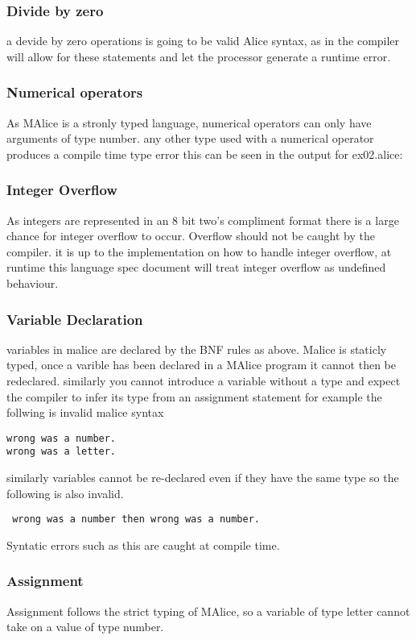 \documentclass[a4wide, 10pt]{article}
\begin{document}
\subsubsection{Divide by zero}
a devide by zero operations is going to be valid Alice syntax, as in the compiler
will allow for these statements and let the processor generate a runtime error.


\subsubsection{Numerical operators}
As MAlice is a stronly typed language, numerical operators can only have 
arguments of type number. any other type used with a numerical operator produces
a compile time type error this can be seen in the output for ex02.alice:


\subsubsection{Integer Overflow}
As integers are represented in an 8 bit two's compliment format there is a 
large chance for integer overflow to occur. Overflow should not be caught by the
compiler. it is up to the implementation on how to handle integer overflow, at 
runtime this language spec document will treat integer overflow as undefined 
behaviour.


\subsubsection{Variable Declaration}
variables in malice are declared by the BNF rules as above.
Malice is staticly typed, once a varible has been declared in a MAlice program 
it cannot then be redeclared. similarly you cannot introduce a variable without 
a type and expect the compiler to infer its type from an assignment statement for
example the follwing is invalid malice syntax

\texttt{wrong was a number.\\wrong was a letter.}

similarly variables cannot be re-declared even if they have the same type so the
following is also invalid.

\texttt{ wrong was a number then wrong was a number.}

Syntatic errors such as this are caught at compile time.


\subsubsection{Assignment}
Assignment follows the strict typing of MAlice, so a variable of type letter 
cannot take on a value of type number.
\end{document}
